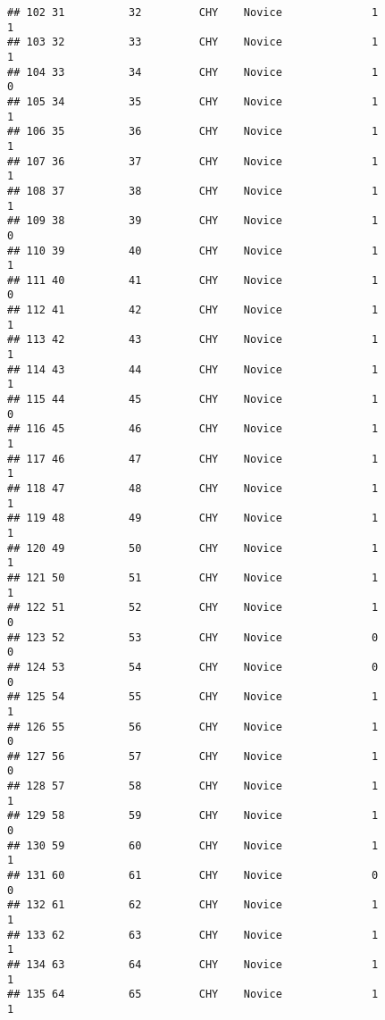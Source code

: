 \documentclass[
]{article}
\begin{document}
\begin{verbatim}
## 102 31          32         CHY    Novice              1                 1
## 103 32          33         CHY    Novice              1                 1
## 104 33          34         CHY    Novice              1                 0
## 105 34          35         CHY    Novice              1                 1
## 106 35          36         CHY    Novice              1                 1
## 107 36          37         CHY    Novice              1                 1
## 108 37          38         CHY    Novice              1                 1
## 109 38          39         CHY    Novice              1                 0
## 110 39          40         CHY    Novice              1                 1
## 111 40          41         CHY    Novice              1                 0
## 112 41          42         CHY    Novice              1                 1
## 113 42          43         CHY    Novice              1                 1
## 114 43          44         CHY    Novice              1                 1
## 115 44          45         CHY    Novice              1                 0
## 116 45          46         CHY    Novice              1                 1
## 117 46          47         CHY    Novice              1                 1
## 118 47          48         CHY    Novice              1                 1
## 119 48          49         CHY    Novice              1                 1
## 120 49          50         CHY    Novice              1                 1
## 121 50          51         CHY    Novice              1                 1
## 122 51          52         CHY    Novice              1                 0
## 123 52          53         CHY    Novice              0                 0
## 124 53          54         CHY    Novice              0                 0
## 125 54          55         CHY    Novice              1                 1
## 126 55          56         CHY    Novice              1                 0
## 127 56          57         CHY    Novice              1                 0
## 128 57          58         CHY    Novice              1                 1
## 129 58          59         CHY    Novice              1                 0
## 130 59          60         CHY    Novice              1                 1
## 131 60          61         CHY    Novice              0                 0
## 132 61          62         CHY    Novice              1                 1
## 133 62          63         CHY    Novice              1                 1
## 134 63          64         CHY    Novice              1                 1
## 135 64          65         CHY    Novice              1                 1

\end{verbatim}
\end{document}
